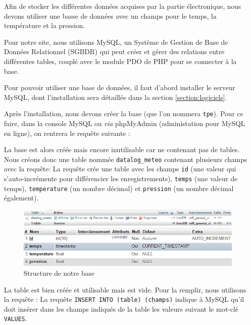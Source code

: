 Afin de stocker les différentes données acquises par la partie électronique, nous devons utiliser une basse de données avec un champs pour le temps, la température et la pression.

\Espace

Pour notre site, nous utilisons MySQL, un Système de Gestion de Base de Données Relationnel (SGBDR) qui peut créer et gérer des relations entre différentes tables, couplé avec le module PDO de PHP pour se connecter à la base.

Pour pouvoir utiliser une base de données, il faut d'abord installer le serveur MySQL, dont l'installation sera détaillée dans la section \ref{section:logiciels}.

Après l'installation, nous devons créer la base (que l'on nommera \verb-tpe-). Pour ce faire, dans la console MySQL ou \emph{via} phpMyAdmin (administation pour MySQL en ligne), on rentrera le requête suivante :

La base est alors créée mais encore inutilisable car ne contenant pas de tables. Nous créons donc une table nommée \verb-datalog_meteo- contenant plusieurs champs avec la requête:
La requête crée une table avec les champs \verb-id- (une valeur qui s'auto-incrémente pour différencier les enregistrements), \verb-temps- (une valeur de temps), \verb-temperature- (un nombre décimal) et \verb-pression- (un nombre décimal également). 

\begin{figure}[!h]
	\centering
	\includegraphics[width=.8\linewidth]{Images/BDD}
	
	\vspace{5mm}
	
	\includegraphics[width=.8\linewidth]{Images/Structure_BDD}
	\caption{Structure de notre base}
\end{figure}

La table est bien créée et utilisable mais est vide. Pour la remplir, nous utilisons la requête :
La requête \verb-INSERT INTO (table) (champs)- indique à MySQL qu'il doit insérer dans les champs indiqués de la table les valeurs suivant le mot-clé \verb-VALUES-.

